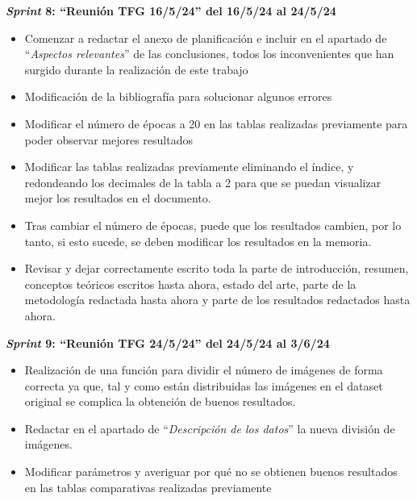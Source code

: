 \textbf{\textit{Sprint} 8: ``Reunión TFG 16/5/24'' del 16/5/24 al 24/5/24}
\begin{itemize}
    \item Comenzar a redactar el anexo de planificación e incluir en el apartado de ``\textit{Aspectos relevantes}'' de las conclusiones, todos los inconvenientes que han surgido durante la realización de este trabajo
    \item Modificación de la bibliografía para solucionar algunos errores
    \item Modificar el número de épocas a 20 en las tablas realizadas previamente para poder observar mejores resultados
    \item Modificar las tablas realizadas previamente eliminando el índice, y redondeando los decimales de la tabla a 2 para que se puedan visualizar mejor los resultados en el documento.
    \item Tras cambiar el número de épocas, puede que los resultados cambien, por lo tanto, si esto sucede, se deben modificar los resultados en la memoria.
    \item Revisar y dejar correctamente escrito toda la parte de introducción, resumen, conceptos teóricos escritos hasta ahora, estado del arte, parte de la metodología redactada hasta ahora y parte de los resultados redactados hasta ahora.
\end{itemize}

\textbf{\textit{Sprint} 9: ``Reunión TFG 24/5/24'' del 24/5/24 al 3/6/24}
\begin{itemize}
    \item Realización de una función para dividir el número de imágenes de forma correcta ya que, tal y como están distribuidas las imágenes en el dataset original se complica la obtención de buenos resultados.
    \item Redactar en el apartado de ``\textit{Descripción de los datos}'' la nueva división de imágenes.
    \item Modificar parámetros y averiguar por qué no se obtienen buenos resultados en las tablas comparativas realizadas previamente
\end{itemize}

